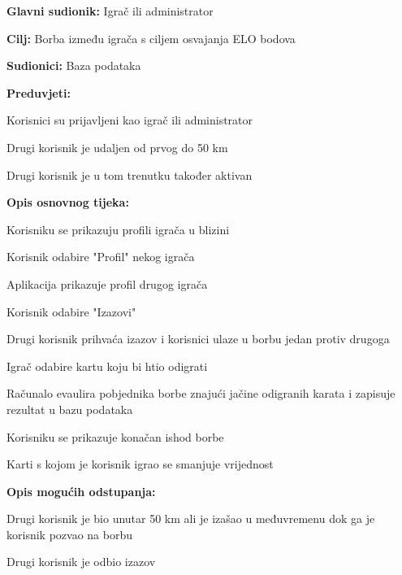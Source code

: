 \noindent {}
\begin{packed_item}
	\item \textbf{Glavni sudionik:} Igrač ili administrator
	\item  \textbf{Cilj:} Borba između igrača s ciljem osvajanja ELO bodova
	\item  \textbf{Sudionici:} Baza podataka
    \item \textbf{Preduvjeti:}
	\item[]  \begin{packed_enum}
	    \item Korisnici su prijavljeni kao igrač ili administrator
        \item Drugi korisnik je udaljen od prvog do 50 km
        \item Drugi korisnik je u tom trenutku također aktivan
	\end{packed_enum}
	\item  \textbf{Opis osnovnog tijeka:}
	\item[] \begin{packed_enum}
        \item Korisniku se prikazuju profili igrača u blizini
        \item Korisnik odabire "Profil" nekog igrača
        \item Aplikacija prikazuje profil drugog igrača
        \item Korisnik odabire "Izazovi"
        \item Drugi korisnik prihvaća izazov i korisnici ulaze u borbu jedan protiv drugoga
        \item Igrač odabire kartu koju bi htio odigrati
        \item Računalo evaulira pobjednika borbe znajući jačine odigranih karata i zapisuje rezultat u bazu podataka
        \item Korisniku se prikazuje konačan ishod borbe
        \item Karti s kojom je korisnik igrao se smanjuje vrijednost
	\end{packed_enum}
	\item  \textbf{Opis mogućih odstupanja:} 
    \item[] \begin{packed_enum}
        \item Drugi korisnik je bio unutar 50 km ali je izašao u međuvremenu dok ga je korisnik pozvao na borbu
        \item Drugi korisnik je odbio izazov
    \end{packed_enum}
\end{packed_item}

